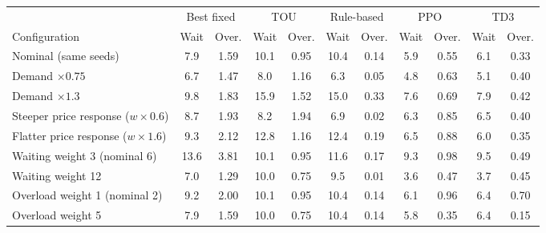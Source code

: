 \begin{tabular}{@{}lcccccccccc@{}}
\toprule
 & \multicolumn{2}{c}{Best fixed} & \multicolumn{2}{c}{TOU} & \multicolumn{2}{c}{Rule-based} & \multicolumn{2}{c}{PPO} & \multicolumn{2}{c}{TD3} \\
\cmidrule(lr){2-3}\cmidrule(lr){4-5}\cmidrule(lr){6-7}\cmidrule(lr){8-9}\cmidrule(lr){10-11}
Configuration & Wait & Over. & Wait & Over. & Wait & Over. & Wait & Over. & Wait & Over. \\
\midrule
Nominal (same seeds) & 7.9 & 1.59 & 10.1 & 0.95 & 10.4 & 0.14 & 5.9 & 0.55 & 6.1 & 0.33 \\
\midrule
Demand $\times 0.75$ & 6.7 & 1.47 & 8.0 & 1.16 & 6.3 & 0.05 & 4.8 & 0.63 & 5.1 & 0.40 \\
Demand $\times 1.3$ & 9.8 & 1.83 & 15.9 & 1.52 & 15.0 & 0.33 & 7.6 & 0.69 & 7.9 & 0.42 \\
Steeper price response ($w\times 0.6$) & 8.7 & 1.93 & 8.2 & 1.94 & 6.9 & 0.02 & 6.3 & 0.85 & 6.5 & 0.40 \\
Flatter price response ($w\times 1.6$) & 9.3 & 2.12 & 12.8 & 1.16 & 12.4 & 0.19 & 6.5 & 0.88 & 6.0 & 0.35 \\
Waiting weight 3 (nominal 6) & 13.6 & 3.81 & 10.1 & 0.95 & 11.6 & 0.17 & 9.3 & 0.98 & 9.5 & 0.49 \\
Waiting weight 12 & 7.0 & 1.29 & 10.0 & 0.75 & 9.5 & 0.01 & 3.6 & 0.47 & 3.7 & 0.45 \\
Overload weight 1 (nominal 2) & 9.2 & 2.00 & 10.1 & 0.95 & 10.4 & 0.14 & 6.1 & 0.96 & 6.4 & 0.70 \\
Overload weight 5 & 7.9 & 1.59 & 10.0 & 0.75 & 10.4 & 0.14 & 5.8 & 0.35 & 6.4 & 0.15 \\
\bottomrule
\end{tabular}